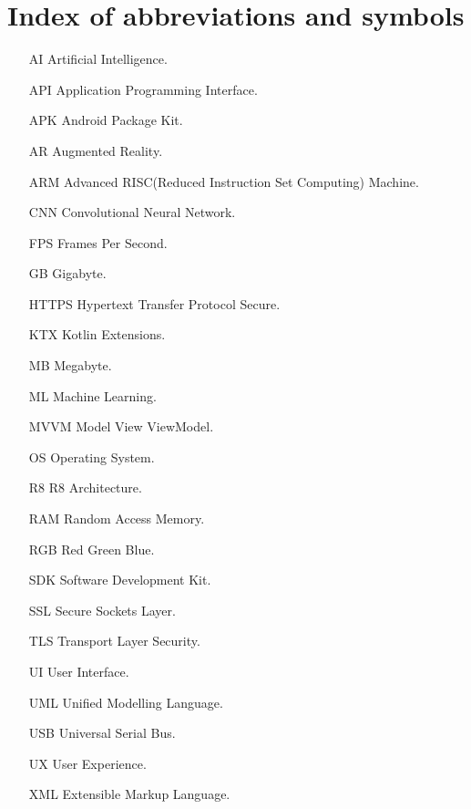 
\chapter{Index of abbreviations and symbols}

\begin{itemize}
    \item[AI] Artificial Intelligence.
    \item[API] Application Programming Interface.
    \item[APK] Android Package Kit.
    \item[AR] Augmented Reality.
    \item[ARM] Advanced RISC(Reduced Instruction Set Computing) Machine.
    \item[CNN] Convolutional Neural Network.
    \item[FPS] Frames Per Second.
    \item[GB] Gigabyte.
    \item[HTTPS] Hypertext Transfer Protocol Secure.
    \item[KTX] Kotlin Extensions.
    \item[MB] Megabyte.
    \item[ML] Machine Learning.
    \item[MVVM] Model View ViewModel.
    \item[OS] Operating System.
    \item[R8] R8 Architecture.
    \item[RAM] Random Access Memory.
    \item[RGB] Red Green Blue.
    \item[SDK] Software Development Kit.
    \item[SSL] Secure Sockets Layer.
    \item[TLS] Transport Layer Security.
    \item[UI] User Interface.
    \item[UML] Unified Modelling Language.
    \item[USB] Universal Serial Bus.
    \item[UX] User Experience.
    \item[XML] Extensible Markup Language.
\end{itemize}    
